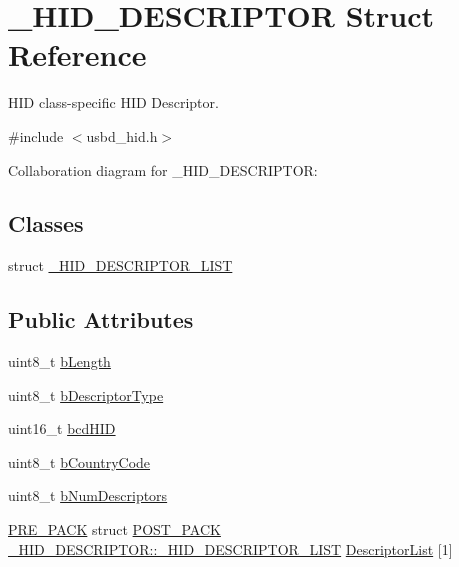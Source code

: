 \hypertarget{struct___h_i_d___d_e_s_c_r_i_p_t_o_r}{}\section{\+\_\+\+H\+I\+D\+\_\+\+D\+E\+S\+C\+R\+I\+P\+T\+OR Struct Reference}
\label{struct___h_i_d___d_e_s_c_r_i_p_t_o_r}


H\+ID class-\/specific H\+ID Descriptor.  




{\ttfamily \#include $<$usbd\+\_\+hid.\+h$>$}



Collaboration diagram for \+\_\+\+H\+I\+D\+\_\+\+D\+E\+S\+C\+R\+I\+P\+T\+OR\+:
\subsection*{Classes}
\begin{DoxyCompactItemize}
\item 
struct \hyperlink{struct___h_i_d___d_e_s_c_r_i_p_t_o_r_1_1___h_i_d___d_e_s_c_r_i_p_t_o_r___l_i_s_t}{\+\_\+\+H\+I\+D\+\_\+\+D\+E\+S\+C\+R\+I\+P\+T\+O\+R\+\_\+\+L\+I\+ST}
\end{DoxyCompactItemize}
\subsection*{Public Attributes}
\begin{DoxyCompactItemize}
\item 
uint8\+\_\+t \hyperlink{struct___h_i_d___d_e_s_c_r_i_p_t_o_r_abec52caed8ae7c6265e6aa9fccfec729}{b\+Length}
\item 
uint8\+\_\+t \hyperlink{struct___h_i_d___d_e_s_c_r_i_p_t_o_r_a212247b88d45fcb74da281192f9d4d02}{b\+Descriptor\+Type}
\item 
uint16\+\_\+t \hyperlink{struct___h_i_d___d_e_s_c_r_i_p_t_o_r_acb02b2afae4c474d60d3ce5ea90d6b3d}{bcd\+H\+ID}
\item 
uint8\+\_\+t \hyperlink{struct___h_i_d___d_e_s_c_r_i_p_t_o_r_a6d494d09bf37ea067da3a089f0c966ba}{b\+Country\+Code}
\item 
uint8\+\_\+t \hyperlink{struct___h_i_d___d_e_s_c_r_i_p_t_o_r_a9613890e6d0ae78428807a72beb64d74}{b\+Num\+Descriptors}
\item 
\hyperlink{packing_8h_acc3c481448529f669321259811237223}{P\+R\+E\+\_\+\+P\+A\+CK} struct \hyperlink{packing_8h_ab1e9c0309e1375636d619d53c9823b29}{P\+O\+S\+T\+\_\+\+P\+A\+CK} \hyperlink{struct___h_i_d___d_e_s_c_r_i_p_t_o_r_1_1___h_i_d___d_e_s_c_r_i_p_t_o_r___l_i_s_t}{\+\_\+\+H\+I\+D\+\_\+\+D\+E\+S\+C\+R\+I\+P\+T\+O\+R\+::\+\_\+\+H\+I\+D\+\_\+\+D\+E\+S\+C\+R\+I\+P\+T\+O\+R\+\_\+\+L\+I\+ST} \hyperlink{struct___h_i_d___d_e_s_c_r_i_p_t_o_r_ab147b0fb12a4d62db59bb05846a48161}{Descriptor\+List} \mbox{[}1\mbox{]}
\end{DoxyCompactItemize}


